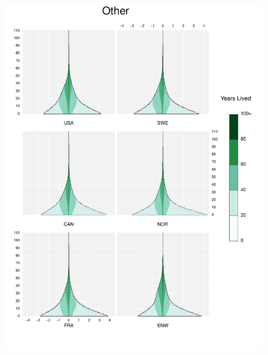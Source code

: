 \documentclass{article}
\begin{document}
\begin{appendices}
\begin{figure}
\includegraphics[scale=.8]{Figures/Causes/DyxOther.pdf}
\end{figure}

\pagebreak

\end{appendices}
\end{document}
